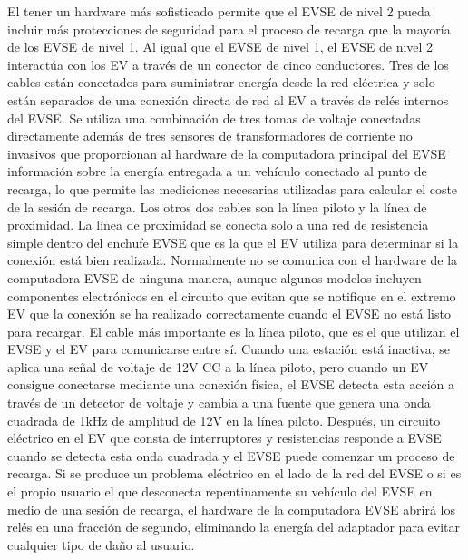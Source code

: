 \documentclass[12pt,a4paper,onecolumn,oneside]{report}
\begin{document}
El tener un hardware más sofisticado permite que el EVSE de nivel 2 pueda incluir más protecciones de seguridad para el proceso de recarga que la mayoría de los EVSE de nivel 1. Al igual que el EVSE de nivel 1, el EVSE de nivel 2 interactúa con los EV a través de un conector de cinco conductores. Tres de los cables están conectados para suministrar energía desde la red eléctrica y solo están separados de una conexión directa de red al EV a través de relés internos del EVSE. Se utiliza una combinación de tres tomas de voltaje conectadas directamente además de tres sensores de transformadores de corriente no invasivos que proporcionan al hardware de la computadora principal del EVSE información sobre la energía entregada a un vehículo conectado al punto de recarga, lo que permite las mediciones necesarias utilizadas para calcular el coste de la sesión de recarga. Los otros dos cables son la línea piloto y la línea de proximidad. La línea de proximidad se conecta solo a una red de resistencia simple dentro del enchufe EVSE que es la que el EV utiliza para determinar si la conexión está bien realizada. Normalmente no se comunica con el hardware de la computadora EVSE de ninguna manera, aunque algunos modelos incluyen componentes electrónicos en el circuito que evitan que se notifique en el extremo EV que la conexión se ha realizado correctamente cuando el EVSE no está listo para recargar. El cable más importante es la línea piloto, que es el que utilizan el EVSE y el EV para comunicarse entre sí. Cuando una estación está inactiva, se aplica una señal de voltaje de 12V CC a la línea piloto, pero cuando un EV consigue conectarse mediante una conexión física, el EVSE detecta esta acción a través de un detector de voltaje y cambia a una fuente que genera una onda cuadrada de 1kHz de amplitud de 12V en la línea piloto. Después, un circuito eléctrico en el EV que consta de interruptores y resistencias responde a EVSE cuando se detecta esta onda cuadrada y el EVSE puede comenzar un proceso de recarga. Si se produce un problema eléctrico en el lado de la red del EVSE o si es el propio usuario el que desconecta repentinamente su vehículo del EVSE en medio de una sesión de recarga, el hardware de la computadora EVSE abrirá los relés en una fracción de segundo, eliminando la energía del adaptador para evitar cualquier tipo de daño al usuario.
\end{document}
